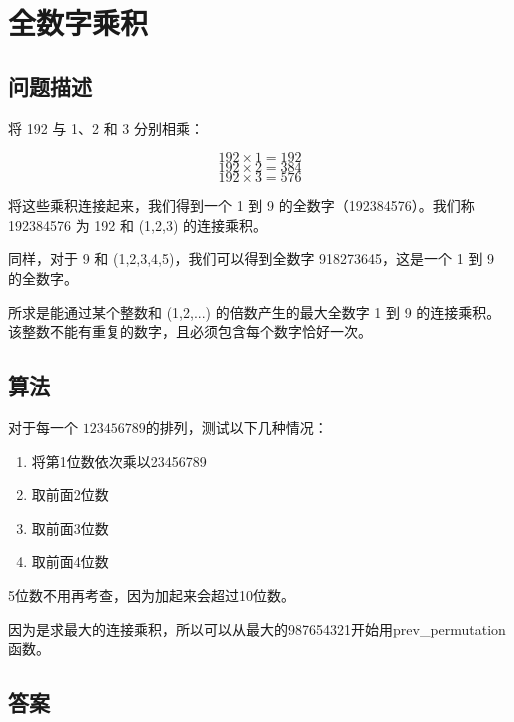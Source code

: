 \section{全数字乘积}
\subsection{问题描述}
\begin{tcolorbox}

将 192 与 1、2 和 3 分别相乘：

\[
192 \times 1 = 192
\]
\[
192 \times 2 = 384
\]
\[
192 \times 3 = 576
\]

将这些乘积连接起来，我们得到一个 1 到 9 的全数字（192384576）。我们称 192384576 为 192 和 (1,2,3) 的连接乘积。

同样，对于 9 和 (1,2,3,4,5)，我们可以得到全数字 918273645，这是一个 1 到 9 的全数字。

所求是能通过某个整数和 (1,2,...) 的倍数产生的最大全数字 1 到 9 的连接乘积。该整数不能有重复的数字，且必须包含每个数字恰好一次。
\end{tcolorbox}

\subsection{算法}
对于每一个 \( 123456789 \)的排列，测试以下几种情况：
\begin{enumerate}
	\item 将第1位数依次乘以23456789
	\item 取前面2位数
	\item 取前面3位数
	\item 取前面4位数
\end{enumerate}
5位数不用再考查，因为加起来会超过10位数。

因为是求最大的连接乘积，所以可以从最大的987654321开始用prev\_permutation函数。

\subsection{答案}
